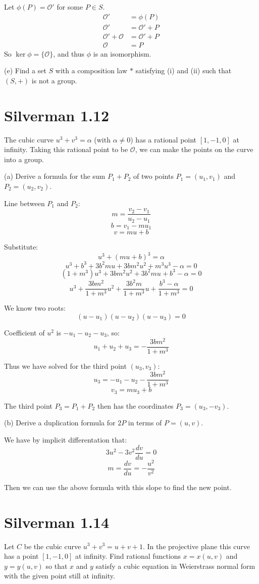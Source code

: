\documentclass{article}
\begin{document}
Let $\phi(P) = \mathcal{O}'$ for some $P \in S$.
\begin{align*}
\mathcal{O}' &= \phi(P) \\
\mathcal{O}' &= \mathcal{O}' + P \\
\mathcal{O}' + \mathcal{O} &= \mathcal{O}' + P \\
\mathcal{O} &= P
\end{align*}
So $\ker\phi = \{\mathcal{O}\}$, and thus $\phi$ is an isomorphism.

(e) Find a set $S$ with a composition law $*$ satisfying (i) and (ii) such that $(S,+)$ is not a group.

\section{Silverman 1.12}
The cubic curve $u^3 + v^3 = \alpha$ (with $\alpha \neq 0$) has a rational point $[1,-1,0]$ at infinity. Taking this rational point to be $\mathcal{O}$, we can make the points on the curve into a group.

(a) Derive a formula for the sum $P_1 + P_2$ of two points $P_1 = (u_1, v_1)$ and $P_2 = (u_2, v_2)$.

Line between $P_1$ and $P_2$:
$$m = \frac{v_2 - v_1}{u_2 - u_1}$$
$$b = v_1 - mu_1$$
$$v = mu + b$$

Substitute:
$$u^3 + (mu + b)^3 = \alpha$$
$$u^3 + b^3 + 3b^2mu + 3bm^2u^2 + m^3u^3 - \alpha = 0$$
$$(1+m^3) u^3 + 3bm^2 u^2 + 3b^2m u + b^3 - \alpha = 0$$
$$u^3 + \frac{3bm^2}{1+m^3}u^2 + \frac{3b^2m}{1+m^3}u + \frac{b^3-\alpha}{1+m^3} = 0$$

We know two roots:
$$(u-u_1)(u-u_2)(u-u_3) = 0$$

Coefficient of $u^2$ is $-u_1-u_2-u_3$, so:
$$u_1 + u_2 + u_3 = -\frac{3bm^2}{1+m^3}$$

Thus we have solved for the third point $(u_3,v_3)$:
$$u_3 = - u_1 - u_2 - \frac{3bm^2}{1+m^3}$$
$$v_3 = mu_3 + b$$

The third point $P_3 = P_1 + P_2$ then has the coordinates $P_3 = (u_3, -v_3)$.

(b) Derive a duplication formula for $2P$ in terms of $P = (u,v)$.

We have by implicit differentation that:
$$3u^2 - 3v^2 \frac{dv}{du} = 0$$
$$m = \frac{dv}{du} = -\frac{u^2}{v^2}$$

Then we can use the above formula with this slope to find the new point.

\section{Silverman 1.14}
Let $C$ be the cubic curve $u^3 + v^3 = u+v+1$. In the projective plane this curve has a point $[1,-1,0]$ at infinity. Find rational functions $x = x(u,v)$ and $y=y(u,v)$ so that $x$ and $y$ satisfy a cubic equation in Weierstrass normal form with the given point still at infinity.
\end{document}
